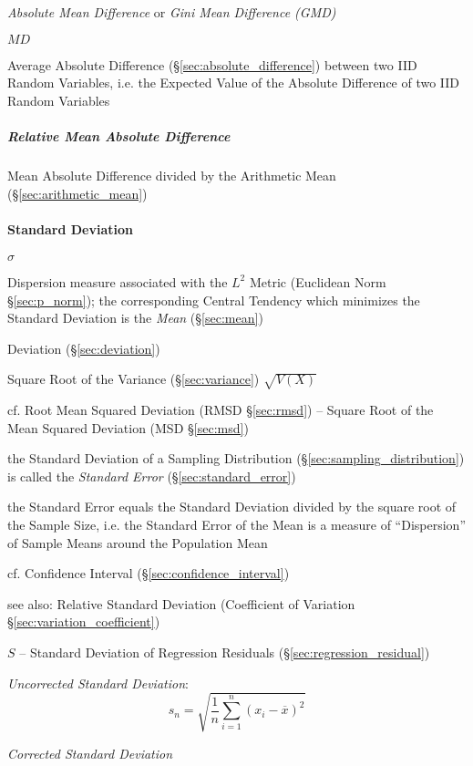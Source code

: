\emph{Absolute Mean Difference} or \emph{Gini Mean Difference (GMD)}

$MD$

Average Absolute Difference (\S\ref{sec:absolute_difference}) between two IID
Random Variables, i.e. the Expected Value of the Absolute Difference of two IID
Random Variables



\subparagraph{Relative Mean Absolute Difference}
\label{sec:relative_mean_absolute_difference}\hfill

Mean Absolute Difference divided by the Arithmetic Mean
(\S\ref{sec:arithmetic_mean})



\paragraph{Standard Deviation}\label{sec:standard_deviation}\hfill

$\sigma$

Dispersion measure associated with the $L^2$ Metric (Euclidean Norm
\S\ref{sec:p_norm}); the corresponding Central Tendency which minimizes the
Standard Deviation is the \emph{Mean} (\S\ref{sec:mean})

Deviation (\S\ref{sec:deviation})

Square Root of the Variance (\S\ref{sec:variance}) $\sqrt{V(X)}$

cf. Root Mean Squared Deviation (RMSD \S\ref{sec:rmsd}) -- Square Root of the
Mean Squared Deviation (MSD \S\ref{sec:msd})

the Standard Deviation of a Sampling Distribution
(\S\ref{sec:sampling_distribution}) is called the \emph{Standard Error}
(\S\ref{sec:standard_error})

the Standard Error equals the Standard Deviation divided by the square root of
the Sample Size, i.e. the Standard Error of the Mean is a measure of
``Dispersion'' of Sample Means around the Population Mean

cf. Confidence Interval (\S\ref{sec:confidence_interval})

see also: Relative Standard Deviation (Coefficient of Variation
\S\ref{sec:variation_coefficient})

$S$ -- Standard Deviation of Regression Residuals
(\S\ref{sec:regression_residual})

\emph{Uncorrected Standard Deviation}:
\[
  s_n = \sqrt{\frac{1}{n}\sum_{i=1}^n (x_i - \overline{x})^2}
\]

\emph{Corrected Standard Deviation}


